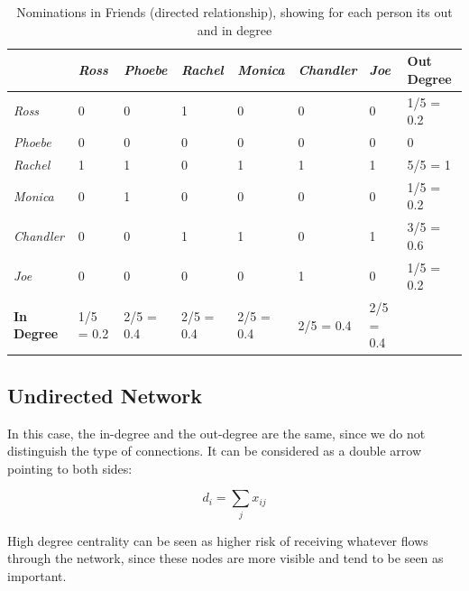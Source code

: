 \documentclass[
  notitlepage,
  onecolumn,
  openany]{book}
\begin{document}
\begin{table}[h]
\centering
\begin{tabular}{@{}llllllll@{}}
\toprule
                   & \textit{Ross} & \textit{Phoebe} & \textit{Rachel} & \textit{Monica} & \textit{Chandler} & \textit{Joe} & \textbf{Out Degree} \\ \midrule
\textit{Ross}      & 0             & 0               & 1               & 0               & 0                 & 0            & 1/5 = 0.2           \\
\textit{Phoebe}    & 0             & 0               & 0               & 0               & 0                 & 0            & 0                   \\
\textit{Rachel}    & 1             & 1               & 0               & 1               & 1                 & 1            & 5/5 = 1             \\
\textit{Monica}    & 0             & 1               & 0               & 0               & 0                 & 0            & 1/5 = 0.2           \\
\textit{Chandler}  & 0             & 0               & 1               & 1               & 0                 & 1            & 3/5 = 0.6           \\
\textit{Joe}       & 0             & 0               & 0               & 0               & 1                 & 0            & 1/5 = 0.2           \\
\textbf{In Degree} & 1/5 = 0.2     & 2/5 = 0.4       & 2/5 = 0.4       & 2/5 = 0.4       & 2/5 = 0.4         & 2/5 = 0.4    &                     \\ \bottomrule
\end{tabular}
\caption{Nominations in Friends (directed relationship), showing for each person its out and in degree}
\label{tab:norm_dir_degree}
\end{table}

\hypertarget{undirected-network}{%
\subsection{Undirected Network}\label{undirected-network}}

In this case, the in-degree and the out-degree are the same, since we do not distinguish the type of connections. It can be considered as a double arrow pointing to both sides:

\[
d_i = \sum_j x_{ij}
\]

High degree centrality can be seen as higher risk of receiving whatever flows through the network, since these nodes are more visible and tend to be seen as important.
\end{document}
